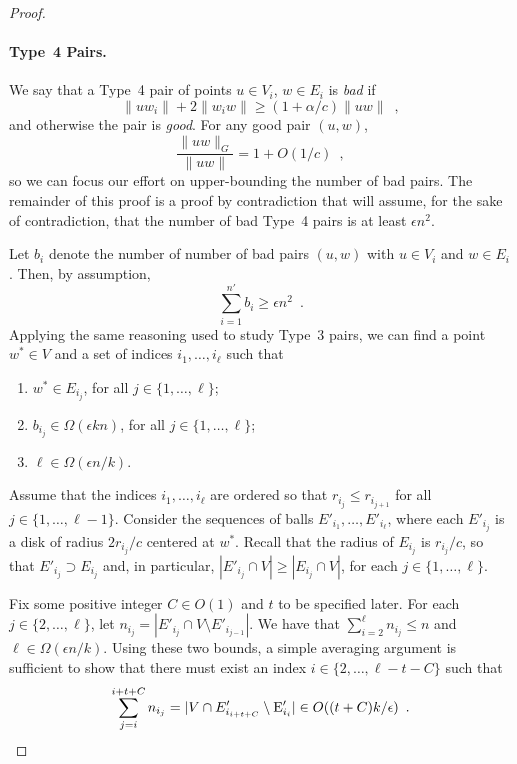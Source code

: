 \documentclass{patmorin}
\begin{document}
\begin{proof}
  \paragraph{Type~4 Pairs.}  
  We say that a Type~4 pair of points $u\in V_i$, $w\in E_i$ is
  \emph{bad} if
  \[
      \|uw_i\|+2\|w_iw\| \ge (1+\alpha/c)\|uw\| \enspace ,
  \]
  and otherwise the pair is \emph{good}.
  For any good pair $(u,w)$,
  \[
    \frac{\|uw\|_G}{\|uw\|} = 1+O(1/c) \enspace ,
  \]
  so we can focus our effort on upper-bounding the number of bad pairs.
  The remainder of this proof is a proof by contradiction that will
  assume, for the sake of contradiction, that the number of bad Type~4
  pairs is at least $\epsilon n^2$.

  Let $b_i$ denote the number of number of bad pairs $(u,w)$ with
  $u\in V_i$ and $w\in E_i$.  Then, by assumption,
  \[
    \sum_{i=1}^{n'} b_i \ge \epsilon n^2 \enspace .
  \]
  Applying the same reasoning used to study Type~3 pairs, we can find a
  point $w^*\in V$ and a set of indices $i_1,\ldots,i_{\ell}$ such that
  \begin{enumerate}
    \item $w^*\in E_{i_j}$, for all $j\in\{1,\ldots,\ell\}$;
    \item $b_{i_j} \in \Omega(\epsilon kn)$, for all $j\in\{1,\ldots,\ell\}$;
    \item $\ell\in \Omega(\epsilon n/k)$.
  \end{enumerate}

  Assume that the indices $i_1,\ldots,i_\ell$ are ordered so that
  $r_{i_j}\le r_{i_{j+1}}$ for all $j\in\{1,\ldots,\ell-1\}$.  Consider
  the sequences of balls $E'_{i_1},\ldots,E'_{i_\ell}$, where each
  $E'_{i_j}$ is a disk of radius $2r_{i_j}/c$ centered at $w^*$. Recall
  that the radius of $E_{i_j}$ is $r_{i_j}/c$, so that $E'_{i_j}\supset
  E_{i_j}$ and, in particular, $|E'_{i_j}\cap V|\ge |E_{i_j}\cap V|$,
  for each $j\in\{1,\ldots,\ell\}$.

  Fix some positive integer $C\in O(1)$ and $t$ to be specified later.
  For each $j\in\{2,\ldots,\ell\}$, let $n_{i_j}=|E'_{i_j}\cap V\setminus
  E'_{i_{j-1}}|$. We have that $\sum_{i=2}^{\ell} n_{i_j} \le n$ and
  $\ell \in\Omega(\epsilon n/k)$.  Using these two bounds, a simple
  averaging argument is sufficient to show that there must exist an
  index $i\in\{2,\ldots,\ell-t-C\}$ such that
  \begin{equation}
     \sum_{j=i}^{i+t+C} n_{i_j}
        = |V\cap E'_{i_{i+t+C}}\setminus \E'_{i_{i}}| 
          \in O((t+C)k/\epsilon) \enspace . \eqlabel{sparse}
  \end{equation}


\end{proof}
\end{document}
